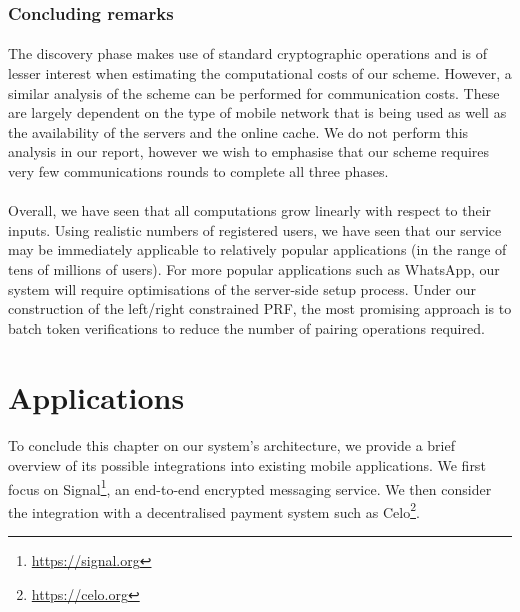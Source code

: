 	\subsubsection{Concluding remarks}
	
	\paragraph{} The discovery phase makes use of standard cryptographic operations and is of lesser interest when estimating the computational costs of our scheme. However, a similar analysis of the scheme can be performed for communication costs. These are largely dependent on the type of mobile network that is being used as well as the availability of the servers and the online cache. We do not perform this analysis in our report, however we wish to emphasise that our scheme requires very few communications rounds to complete all three phases.
	
	
	\paragraph{} Overall, we have seen that all computations grow linearly with respect to their inputs. Using realistic numbers of registered users, we have seen that our service may be immediately applicable to relatively popular applications (in the range of tens of millions of users). For more popular applications such as WhatsApp, our system will require optimisations of the server-side setup process. Under our construction of the left/right constrained PRF, the most promising approach is to batch token verifications to reduce the number of pairing operations required. 
	
 	


\section{Applications}
\label{sec:applications}

\paragraph{} To conclude this chapter on our system's architecture, we provide a brief overview of its possible integrations into existing mobile applications. We first focus on Signal\footnote{\url{https://signal.org}}, an end-to-end encrypted messaging service. We then consider the integration with a decentralised payment system such as Celo\footnote{\url{https://celo.org}}.

